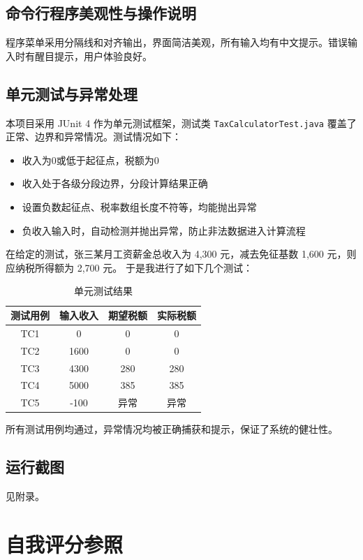 \section{命令行程序美观性与操作说明}
程序菜单采用分隔线和对齐输出，界面简洁美观，所有输入均有中文提示。错误输入时有醒目提示，用户体验良好。

\section{单元测试与异常处理}
本项目采用 JUnit 4 作为单元测试框架，测试类 \texttt{TaxCalculatorTest.java} 覆盖了正常、边界和异常情况。测试情况如下：
\begin{itemize}
	\item 收入为0或低于起征点，税额为0
	\item 收入处于各级分段边界，分段计算结果正确
	\item 设置负数起征点、税率数组长度不符等，均能抛出异常
	\item 负收入输入时，自动检测并抛出异常，防止非法数据进入计算流程
\end{itemize}

在给定的测试，张三某月工资薪金总收入为 4,300 元，减去免征基数 1,600 元，则应纳税所得额为 2,700 元。
于是我进行了如下几个测试：
\begin{table}[htbp]
    \centering
    \begin{tabular}{|c|c|c|c|}
    \hline
    测试用例 & 输入收入 & 期望税额 & 实际税额 \\
    \hline
    TC1 & 0 & 0 & 0 \\
    TC2 & 1600 & 0 & 0 \\
    TC3 & 4300 & 280 & 280 \\
    TC4 & 5000 & 385 & 385 \\
    TC5 & -100 & 异常 & 异常 \\
    \hline
    \end{tabular}
    \caption{单元测试结果}
    \label{tab:test-results}
\end{table}

所有测试用例均通过，异常情况均被正确捕获和提示，保证了系统的健壮性。

\section{运行截图}
见附录。

\chapter{自我评分参照}

